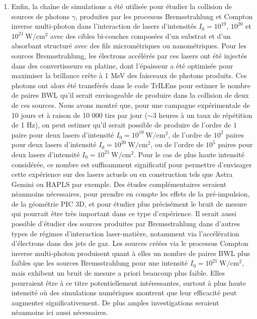 \begin{refsection}
\begin{enumerate}
    \item Enfin, la chaîne de simulations a été utilisée pour étudier la collision de sources de photons $\gamma$, produites par les processus Bremsstrahlung et Compton inverse multi-photon dans l'interaction de lasers d'intensités $I_0=10^{19}$, $10^{20}$ et $10^{21} ~ \si{\W\per\cm^2}$ avec des cibles bi-couches composées d'un substrat et d'un absorbant structuré avec des fils micrométriques ou nanométriques. Pour les sources Bremsstrahlung, les électrons accélérés par ces lasers ont été injectés dans des convertisseurs en platine, dont l'épaisseur a été optimisée pour maximiser la brillance crête à 1 MeV des faisceaux de photons produits. Ces photons ont alors été transférés dans le code TrILEns pour estimer le nombre de paires BWL qu'il serait envisageable de produire dans la collision de deux de ces sources. Nous avons montré que, pour une campagne expérimentale de 10 jours et à raison de 10 000 tirs par jour ($\sim 3$ heures à un taux de répétition de 1 Hz), on peut estimer qu'il serait possible de produire de l'ordre de $1$ paire pour deux lasers d'intensité $I_0=10^{19} ~ \si{\W\per\cm^2}$, de l'ordre de $10^2$ paires pour deux lasers d'intensité $I_0=10^{20} ~ \si{\W\per\cm^2}$, ou de l'ordre de $10^5$ paires pour deux lasers d'intensité $I_0=10^{21} ~ \si{\W\per\cm^2}$. Pour le cas de plus haute intensité considérée, ce nombre est suffisamment significatif pour permettre d'envisager cette expérience sur des lasers actuels ou en construction tels que Astra Gemini \parencite{laser_gemini} ou HAPLS \parencite{laser_hapls} par exemple. 
    Des études complémentaires seraient néanmoins nécessaires, pour prendre en compte les effets de la pré-impulsion, de la géométrie PIC 3D, et pour étudier plus précisément le bruit de mesure qui pourrait être très important dans ce type d'expérience. Il serait aussi possible d'étudier des sources produites par Bremsstrahlung dans d'autres types de régimes d'interaction laser-matière, notamment via l'accélération d'électrons dans des jets de gaz.
    Les sources créées via le processus Compton inverse multi-photon produisent quant à elles un nombre de paires BWL plus faibles que les sources Bremsstrahlung pour une intensité $I_0=10^{21} ~ \si{\W\per\cm^2}$, mais exhibent un bruit de mesure a priori beaucoup plus faible. Elles pourraient être à ce titre potentiellement intéressantes, surtout à plus haute intensité où des simulations numériques montrent que leur efficacité peut augmenter significativement. De plus amples investigations seraient néanmoins ici aussi nécessaires.
\end{enumerate}


\end{refsection}
